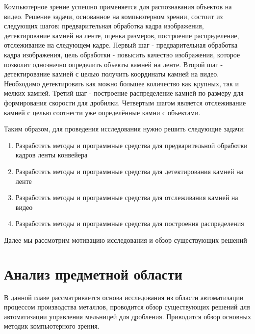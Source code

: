 \documentclass[specification,annotation,times]{itmo-student-thesis}
\begin{document}
Компьютерное зрение успешно применяется для распознавания объектов на видео. Решение задачи, основанное на компьютерном зрении, состоит из следующих шагов: предварительная обработка кадра изображения, детектирование камней на ленте, оценка размеров, построение распределение, отслеживание на следующем кадре.
Первый шаг - предварительная обработка кадра изображения, цель обработки - повысить качество изображения, которое позволит однозначно определить объекты камней на ленте. Второй шаг - детектирование камней с целью получить координаты камней на видео. Необходимо детектировать как можно большее количество как крупных, так и мелких камней. Третий шаг - построение распределение камней по размеру для формирования скорости для дробилки. Четвертым шагом является отслеживание камней с целью соотнести уже определённые камни с объектами. 

Таким образом, для проведения исследования нужно решить следующие задачи:
\begin{enumerate}
	\item Разработать методы и программные средства для предварительной обработки кадров ленты конвейера
	\item Разработать методы и программные средства для детектирования камней на ленте
	\item Разработать методы и программные средства для отслеживания камней на видео
	\item Разработать методы и программные средства для построения распределения
\end{enumerate}

Далее мы рассмотрим мотивацию исследования и обзор существующих решений







\chapter{Анализ предметной области}
В данной главе рассматривается основа исследования из области автоматизации процессом производства металлов, проводится обзор существующих решений для автоматизации управления мельницей для дробления. Приводится обзор основных методик компьютерного зрения.
\startrelatedwork
\end{document}
